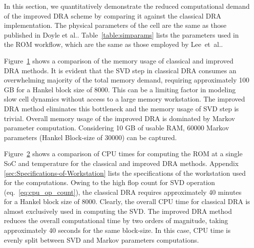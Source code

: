 In this section, we quantitatively demonstrate the reduced computational
demand of the improved DRA scheme by comparing it against the classical
DRA implementation. The physical parameters of the cell are the same
as those published in Doyle et al.\citep{FullerDoyleNewman1994}.
Table~\ref{table:simparams} lists the parameters used in the ROM
workflow, which are the same as those employed by Lee~et~al.\citep{LeeChemistruckPlett2012}.

\begin{figure}
	\caption{}
	\label{memory}
\end{figure}

Figure~\ref{memory} shows a comparison of the memory usage of
classical and improved DRA methods. It is evident that the SVD step
in classical DRA consumes an overwhelming majority of the total memory
demand, requiring approximately 100 GB for a Hankel block size of
8000. This can be a limiting factor in modeling slow cell dynamics
without access to a large memory workstation. The improved DRA method
eliminates this bottleneck and the memory usage of SVD step is trivial.
Overall memory usage of the improved DRA is dominated by Markov parameter
computation. Considering 10 GB of usable RAM, 60000 Markov parameters
(Hankel Block-size of 30000) can be captured.

Figure~\ref{cputime} shows a comparison of CPU times for computing
the ROM at a single SoC and temperature for the classical and improved
DRA methods. Appendix \ref{sec:Specifications-of-Workstation} lists the specifications
of the workstation used for the computations. Owing to the high flop
count for SVD operation (eq.~\ref{eq:cpu_op_count}), the classical
DRA requires approximately 40 minutes for a Hankel block size of 8000.
Clearly, the overall CPU time for classical DRA is almost exclusively
used in computing the SVD. The improved DRA method reduces the overall
computational time by two orders of magnitude, taking approximately
40 seconds for the same block-size. In this case, CPU time is evenly
split between SVD and Markov parameters computations.

\begin{figure}
	\caption{}
	\label{cputime}
\end{figure}


